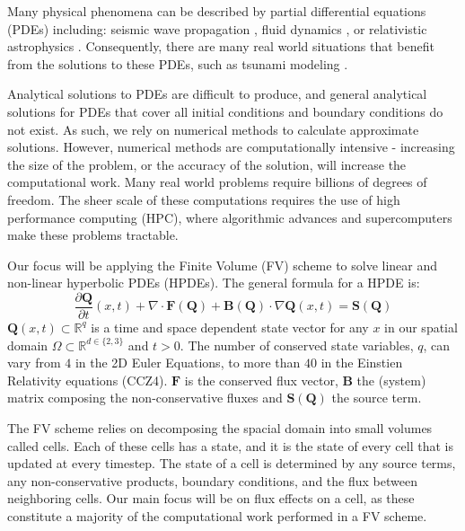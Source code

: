 Many physical phenomena can be described by partial differential equations (PDEs) including:  seismic wave propagation \cite{earthquakePDE}, fluid dynamics \cite{exahype}, or relativistic astrophysics \cite{relativisticPDE}.
Consequently, there are many real world situations that benefit from the solutions to these PDEs, such as tsunami modeling \cite{tsunamiPDE}.


Analytical solutions to PDEs are difficult to produce, and general analytical solutions for PDEs that cover all initial conditions and boundary conditions do not exist.
As such, we rely on numerical methods to calculate approximate solutions.
However, numerical methods are computationally intensive - increasing the size of the problem, or the accuracy of the solution, will increase the computational work.
Many real world problems require billions of degrees of freedom.
The sheer scale of these computations requires the use of high performance computing (HPC), where algorithmic advances and supercomputers make these problems tractable.

Our focus will be applying the Finite Volume (FV) scheme to solve linear and non-linear hyperbolic PDEs (HPDEs).
The general formula for a HPDE is:
\begin{equation}
    \frac{\partial \mathbf{Q}}{\partial t}(x,t) + \nabla \cdot \mathbf{F}(\mathbf{Q}) + \mathbf{B}(\mathbf{Q}) \cdot \nabla \mathbf{Q}(x,t) = \mathbf{S}(\mathbf{Q})
\end{equation}
$\mathbf{Q}(x,t)\subset \mathbb{R}^q$ is a time and space dependent state vector for any $x$ in our spatial domain $\Omega\subset \mathbb{R}^{d \in \{2,3\}}$ and $t>0$.
The number of conserved state variables, $q$, can vary from $4$ in the 2D Euler Equations, to more than $40$ in the Einstien Relativity equations (CCZ4).
$\mathbf{F}$ is the conserved flux vector, $\mathbf{B}$ the (system) matrix composing the non-conservative fluxes and $\mathbf{S}(\mathbf{Q})$ the source term.

The FV scheme relies on decomposing the spacial domain into small volumes called cells.
Each of these cells has a state, and it is the state of every cell that is updated at every timestep.
The state of a cell is determined by any source terms, any non-conservative products, boundary conditions, and the flux between neighboring cells.
Our main focus will be on flux effects on a cell, as these constitute a majority of the computational work performed in a FV scheme.

